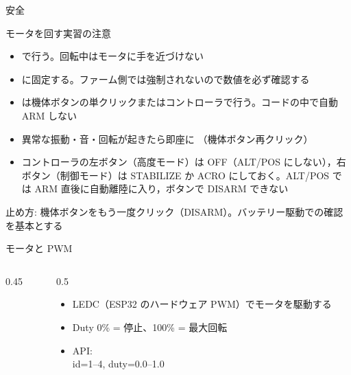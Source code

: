 \begin{frame}{安全}
  \begin{alertblock}{モータを回す実習の注意}
    \begin{itemize}\footnotesize\setlength{\itemsep}{1pt}
      \item {}で行う。回転中はモータに手を近づけない
      \item {}に固定する。ファーム側では強制されないので数値を必ず確認する
      \item {} は機体ボタンの単クリックまたはコントローラで行う。コードの中で自動 ARM しない
      \item 異常な振動・音・回転が起きたら即座に （機体ボタン再クリック）
      \item コントローラの左ボタン（高度モード）は OFF（ALT/POS にしない），右ボタン（制御モード）は STABILIZE か ACRO にしておく。ALT/POS では ARM 直後に自動離陸に入り，ボタンで DISARM できない
    \end{itemize}
  \end{alertblock}

  \vspace{0.3em}

  {\small 止め方: 機体ボタンをもう一度クリック（DISARM）。バッテリー駆動での確認を基本とする}
\end{frame}

\begin{frame}{モータと PWM}
  \begin{columns}[T]
    \begin{column}{0.45\textwidth}
      \centering
      \resizebox{!}{0.62\textheight}{}
    \end{column}
    \begin{column}{0.5\textwidth}
      \vspace{1em}
      \begin{itemize}\small
        \item LEDC（ESP32 のハードウェア PWM）でモータを駆動する
        \item Duty 0\% = 停止、100\% = 最大回転
        \item API: \\
              \small id=1--4, duty=0.0--1.0
      \end{itemize}
    \end{column}
  \end{columns}
\end{frame}

